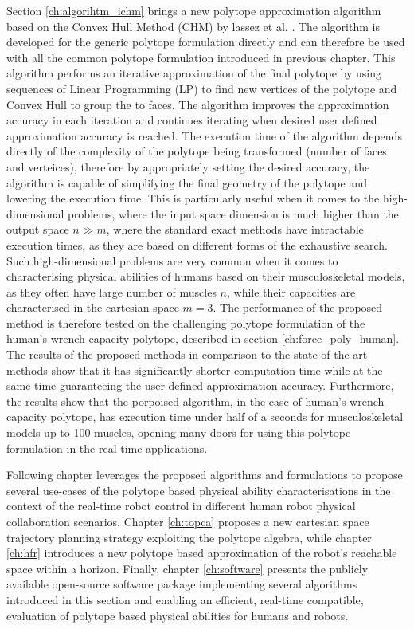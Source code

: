 Section \ref{ch:algorihtm_ichm} brings a new polytope approximation algorithm based on the Convex Hull Method (CHM) by lassez et al. \cite{lassez1992quantifier}. The algorithm is developed for the generic polytope formulation directly and can therefore be used with all the common polytope formulation introduced in previous chapter. This algorithm performs an iterative approximation of the final polytope by using sequences of Linear Programming (LP) to find new vertices of the polytope and Convex Hull to group the to faces. The algorithm improves the approximation accuracy in each iteration and continues iterating when desired user defined approximation accuracy is reached. The execution time of the algorithm depends directly of the complexity of the polytope being transformed (number of faces and verteices), therefore by appropriately setting the desired accuracy, the algorithm is capable of simplifying the final geometry of the polytope and lowering the execution time. This is particularly useful when it comes to the high-dimensional problems, where the input space dimension is much higher than the output space $n\!\gg \!m$, where the standard exact methods have intractable execution times, as they are based on different forms of the exhaustive search. Such high-dimensional problems are very common when it comes to characterising physical abilities of humans based on their musculoskeletal models, as they often have large number of muscles $n$, while their capacities are characterised in the cartesian space $m=3$. The performance of the proposed method is therefore tested on the challenging polytope formulation of the human's wrench capacity polytope, described in section \ref{ch:force_poly_human}. The results of the proposed methods in comparison to the state-of-the-art methods show that it has significantly shorter computation time while at the same time guaranteeing the user defined approximation accuracy. Furthermore, the results show that the porpoised algorithm, in the case of human's wrench capacity polytope, has execution time under half of a seconds for musculoskeletal models up to 100 muscles, opening many doors for using this polytope formulation in the real time applications.

Following chapter leverages the proposed algorithms and formulations to propose several use-cases of the polytope based physical ability characterisations in the context of the real-time robot control in different human robot physical collaboration scenarios. Chapter \ref{ch:topca} proposes a new cartesian space trajectory planning strategy exploiting the polytope algebra, while chapter \ref{ch:hfr} introduces a new polytope based approximation of the robot's reachable space within a horizon. Finally, chapter \ref{ch:software} presents the publicly available open-source software package implementing several algorithms introduced in this section and enabling an efficient, real-time compatible, evaluation of polytope based physical abilities for humans and robots.
